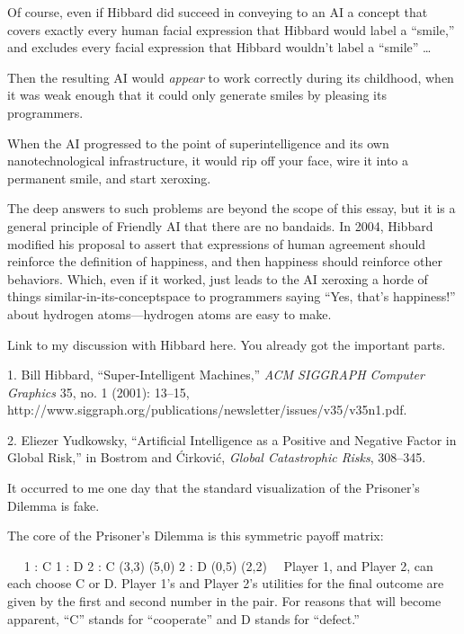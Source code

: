 {
 Of course, even if Hibbard did succeed in conveying to an AI a
concept that covers exactly every human facial expression that Hibbard
would label a ``smile,'' and
excludes every facial expression that Hibbard wouldn't
label a ``smile'' \ldots}

{
 Then the resulting AI would \textit{appear} to work correctly
during its childhood, when it was weak enough that it could only
generate smiles by pleasing its programmers.}

{
 When the AI progressed to the point of superintelligence and its
own nanotechnological infrastructure, it would rip off your face, wire
it into a permanent smile, and start xeroxing.}

{
 The deep answers to such problems are beyond the scope of this
essay, but it is a general principle of Friendly AI that there are no
bandaids. In 2004, Hibbard modified his proposal to assert that
expressions of human agreement should reinforce the definition of
happiness, and then happiness should reinforce other behaviors. Which,
even if it worked, just leads to the AI xeroxing a horde of things
similar-in-its-conceptspace to programmers saying
``Yes, that's
happiness!'' about hydrogen atoms---hydrogen atoms
are easy to make.}

{
 Link to my discussion with Hibbard here. You already got the
important parts.}

\myendsectiontext


\bigskip

{
 1. Bill Hibbard, ``Super-Intelligent
Machines,'' \textit{ACM SIGGRAPH Computer Graphics}
35, no. 1 (2001): 13--15,
http://www.siggraph.org/publications/newsletter/issues/v35/v35n1.pdf.}

{
 2. Eliezer Yudkowsky, ``Artificial Intelligence
as a Positive and Negative Factor in Global Risk,''
in Bostrom and \'Cirkovi\'c, \textit{Global Catastrophic Risks},
308--345.}


{
 It occurred to me one day that the standard visualization of the
Prisoner's Dilemma is fake. }

{
 The core of the Prisoner's Dilemma is this
symmetric payoff matrix:}

{
\ ~ 1 : C 1 : D 2 : C (3,3) (5,0) 2 : D (0,5) (2,2) \ \ Player 1, and
Player 2, can each choose C or D. Player 1's and Player
2's utilities for the final outcome are given by the
first and second number in the pair. For reasons that will become
apparent, ``C'' stands for
``cooperate'' and D stands for
``defect.''}

